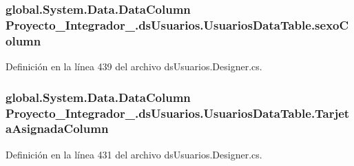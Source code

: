 \hypertarget{class_proyecto___integrador__3_1_1ds_usuarios_1_1_usuarios_data_table_a900ede3b64e19670a69d7ad762ab1695}{
\subsubsection[{sexo\-Column}]{\setlength{\rightskip}{0pt plus 5cm}global.\-System.\-Data.\-Data\-Column Proyecto\-\_\-\-Integrador\-\_.\-ds\-Usuarios.\-Usuarios\-Data\-Table.\-sexo\-Column\hspace{0.3cm}{\ttfamily [get]}}}\label{class_proyecto___integrador__3_1_1ds_usuarios_1_1_usuarios_data_table_a900ede3b64e19670a69d7ad762ab1695}


Definición en la línea 439 del archivo ds\-Usuarios.\-Designer.\-cs.

\hypertarget{class_proyecto___integrador__3_1_1ds_usuarios_1_1_usuarios_data_table_adaf2cdbd83042f6ed4c524deec1469d4}{
\subsubsection[{Tarjeta\-Asignada\-Column}]{\setlength{\rightskip}{0pt plus 5cm}global.\-System.\-Data.\-Data\-Column Proyecto\-\_\-\-Integrador\-\_.\-ds\-Usuarios.\-Usuarios\-Data\-Table.\-Tarjeta\-Asignada\-Column\hspace{0.3cm}{\ttfamily [get]}}}\label{class_proyecto___integrador__3_1_1ds_usuarios_1_1_usuarios_data_table_adaf2cdbd83042f6ed4c524deec1469d4}


Definición en la línea 431 del archivo ds\-Usuarios.\-Designer.\-cs.

